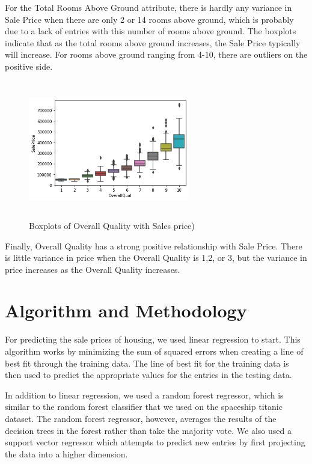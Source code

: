 \documentclass[fleqn,10pt]{SelfArx} %
\begin{document}
For the Total Rooms Above Ground attribute, there is hardly any variance in Sale Price when there are only 2 or 14 rooms above ground, which is probably due to a lack of entries with this number of rooms above ground. The boxplots indicate that as the total rooms above ground increases, the Sale Price typically will increase. For rooms above ground ranging from 4-10, there are outliers on the positive side. 
\begin{figure}[H]
    \centering
    \includegraphics[width=7cm, height=6cm]{img/overallqualboxplot.png}
    \caption{Boxplots of Overall Quality with Sales price)}
    \label{fig:my_label}
\end{figure}
Finally, Overall Quality has a strong positive relationship with Sale Price. There is little variance in price when the Overall Quality is 1,2, or 3, but the variance in price increases as the Overall Quality increases. 

\bigskip
\bigskip



\section{Algorithm and Methodology}

For predicting the sale prices of housing, we used linear regression to start. This algorithm works by minimizing the sum of squared errors when creating a line of best fit through the training data. The line of best fit for the training data is then used to predict the appropriate values for the entries in the testing data. 

In addition to linear regression, we used a random forest regressor, which is similar to the random forest classifier that we used on the spaceship titanic dataset. The random forest regressor, however, averages the results of the decision trees in the forest rather than take the majority vote. We also used a support vector regressor which attempts to predict new entries by first projecting the data into a higher dimension. 
\end{document}
